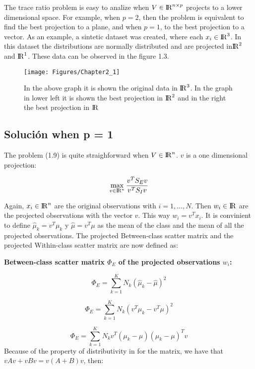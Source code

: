 The trace ratio problem is easy to analize when $V \in {\rm I\!R}^{n \times p}$ projects to a lower dimensional space. For example, when $p = 2$, then the problem is equivalent to find the best projection to a plane, and when $p = 1$, to the best projection to a vector. As an example, a sintetic dataset was created, where each $x_i \in {\rm I\!R}^{3}$. In this dataset the distributions are normally distributed and are projected in${\rm I\!R}^{2}$ and ${\rm I\!R}^{1}$. These data can be observed in the figure 1.3.

\begin{figure}[!ht]\label{Fig1.2}
  \centering
  \texttt{[image: Figures/Chapter2\_1]} 
  \caption[Best projections in ${\rm I\!R}^{2}$ y ${\rm I\!R}$.]
  {In the above graph it is shown the original data in ${\rm I\!R}^{3}$. In the graph in lower left  it is shown the best projection in ${\rm I\!R}^{2}$ and in the right the best projection in ${\rm I\!R}$}
\end{figure}

\subsection{Solución when p = 1}

The problem (1.9) is quite straighforward when $V \in {\rm I\!R}^{n}$. $v$ is a one dimensional projection:


\begin{equation} \label{eq:2.9}
\max_{v \in {\rm I\!R}^{n}} \frac{v^T S_E v}{v^T S_I v}  
\end{equation}

Again, $x_i \in {\rm I\!R}^{n}$ are the original observations with $i = 1 , ... , N $. Then $w_i \in {\rm I\!R}$ are the projected observations with the vector $v$. This way $w_i = v^Tx_i$. It is convinient to define $\widehat{\mu}_k = v^T \mu_k$ y $\widehat{\mu} = v^T \mu$ as the mean of the class and the mean of all the projected observations. The projected Between-class scatter matrix and the projected Within-class scatter matrix are now defined as:

\textbf{Between-class scatter matrix $\Phi_{E}$ of the projected observations $w_i$:}

$$\Phi_{E} = \sum\limits_{k =1}^{K} N_k (\widehat{\mu}_k - \widehat{\mu} )^2$$

$$\Phi_{E} = \sum\limits_{k =1}^{K} N_k (v^T \mu_k - v^T \mu)^2$$

$$\Phi_{E} =  \sum\limits_{k =1}^{K} N_k v^T ( \mu_k - \mu )(\mu_k - \mu )^T v $$
Because of the property of distributivity in for the matrix, we have that $vAv+vBv =  v(A+B)v$, then:

